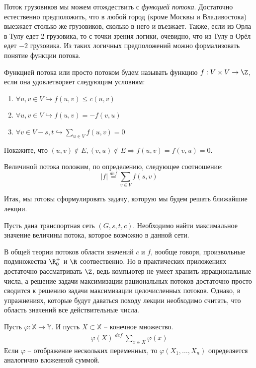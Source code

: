 Поток грузовиков мы можем отождествить с \textit{функцией потока}. Достаточно естественно предположить, что в любой город (кроме Москвы и Владивостока) выезжает столько же грузовиков, сколько в него и въезжает.
Также, если из Орла в Тулу едет 2 грузовика, то с точки зрения логики, очевидно, что из Тулу в Орёл едет $-2$ грузовика. Из таких логичных предположений можно формализовать понятие функции потока.

\Def Функцией потока или просто потоком будем называть функцию $f: V \times V \to \Z$, если она удовлетворяет следующим условиям:
\begin{enumerate}
    \item $\forall u, v \in V \hookrightarrow f(u, v) \leq c(u, v)$
    \item $\forall u, v \in V \hookrightarrow f(u, v) = - f(v, u)$
    \item $\forall v \in V - s, t \hookrightarrow \sum\limits_{u \in V} f(u, v) = 0$
\end{enumerate}

\Exe Покажите, что $(u, v) \not \in E, (v, u) \not \in E \Rightarrow f(u, v) = f(v, u) = 0$.

\Def Величиной потока положим, по определению, следующее соотношение:
\begin{equation*}
    |f| \overset{def}{=} \sum\limits_{v \in V} f(s, v)
\end{equation*}

Итак, мы готовы сформулировать задачу, которую мы будем решать ближайшие лекции.

\Task Пусть дана транспортная сеть $(G, s, t, c)$. Необходимо найти максимальное значение величины потока, которое возможно в данной сети.

\Note В общей теории потоков области значений $c$ и $f$, вообще говоря, произвольные подмножества $\R^+_0$ и $\R$ соотвественно. 
Но в практических приложениях достаточно рассматривать $\Z$, ведь компьютер не умеет хранить иррациональные числа, а решение задачи максимизации рациональных потоков достаточно просто сводится к решению задачи максимизации целочисленных потоков.
Однако, в упражнениях, которые будут даваться походу лекции необходимо считать, что область значений все действительные числа.

\Def Пусть $\varphi: \mathbb{X} \to \mathbb{Y}$. И пусть $X \subset \mathbb{X}$ -- конечное множество.
\begin{eqnarray*}
    \varphi(X) \overset{def}{=} \sum\limits_{x \in X} \varphi(x)
\end{eqnarray*}
Если $\varphi$ -- отображение нескольких переменных, то $\varphi(X_1, \dots, X_n)$ определяется аналогично вложенной суммой.

